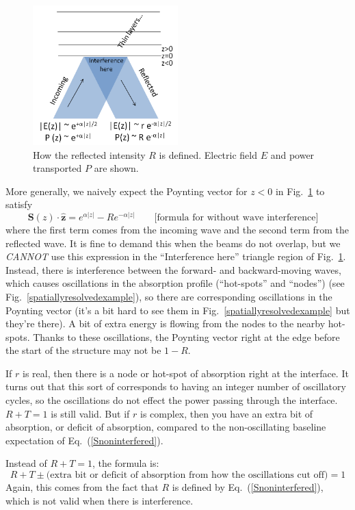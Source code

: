 \documentclass[12pt]{article}
\newcommand{\be}[1]{\begin{equation}\label{#1}} %
\newcommand{\ee}{\end{equation}} %
\renewcommand{\(}{\left(}
\renewcommand{\)}{\right)}
\renewcommand{\S}{\mathbf{S}}
\newcommand{\z}{\hat{\mathbf{z}}}
\begin{document}
\begin{figure}[htb]
\centering
\includegraphics[width=0.5\textwidth]{Rfig.png}
\caption{How the reflected intensity $R$ is defined. Electric field $E$ and power transported $P$ are shown.\label{Rfig}}
\end{figure}

More generally, we naively expect the Poynting vector for $z<0$ in Fig.~\ref{Rfig} to satisfy
\be{Snoninterfered} \S(z)\cdot \z = e^{\alpha |z|} - R e^{-\alpha |z|} \qquad \text{[formula for without wave  interference]} \quad \ee
where the first term comes from the incoming wave and the second term from the reflected wave. It is fine to demand this when the beams do not overlap, but we \emph{CANNOT} use this expression in the ``Interference here'' triangle region of Fig.~\ref{Rfig}. Instead, there is interference between the forward- and backward-moving waves, which causes oscillations in the absorption profile (``hot-spots'' and ``nodes'') (see Fig.~\ref{spatiallyresolvedexample}), so there are corresponding oscillations in the Poynting vector (it's a bit hard to see them in Fig.~\ref{spatiallyresolvedexample} but they're there).  A bit of extra energy is flowing from the nodes to the nearby hot-spots. Thanks to these oscillations, the Poynting vector right at the edge before the start of the structure may not be $1-R$.

If $r$ is real, then there is a node or hot-spot of absorption right at the interface. It turns out that this sort of corresponds to having an integer number of oscillatory cycles, so the oscillations do not effect the power passing through the interface. $R+T=1$ is still valid. But if $r$ is complex, then you have an extra bit of absorption, or deficit of absorption, compared to the non-oscillating baseline expectation of Eq.~(\ref{Snoninterfered}).

Instead of $R+T=1$, the formula is:
$$R+T\pm \text{(extra bit or deficit of absorption from how the oscillations cut off)} = 1$$
Again, this comes from the fact that $R$ is defined by Eq.~(\ref{Snoninterfered}), which is not valid when there is interference.
\end{document}
